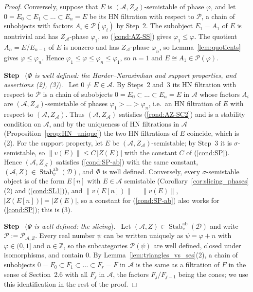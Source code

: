 \documentclass[12pt]{amsart}
\newcommand{\condref}[1]{\textup{(\ref{#1})}}
\numberwithin{theorem}{section}
\theoremstyle{definition}
\newcounter{pstep}
\newcommand{\step}[1]{\par\medskip\noindent\refstepcounter{pstep}\textbf{Step \thepstep}\ (\textit{#1}).\ \ignorespaces}
\newcommand{\ZZ}{\mathbb{Z}}
\newcommand{\calA}{\mathcal{A}}
\newcommand{\calP}{\mathcal{P}}
\newcommand{\calD}{\mathcal{D}}
\begin{document}
\begin{proof}
		Conversely, suppose that $E$ is $(\calA, Z_{\calA})$-semistable of phase $\varphi$, and let $0 = E_0 \subset E_1 \subset \ldots \subset E_n = E$ be its HN filtration with respect to $\calP$, a chain of subobjects with factors $A_i \in \calP(\varphi_i)$ by Step~2.
		The subobject $E_1 = A_1$ of $E$ is nontrivial and has $Z_{\calA}$-phase $\varphi_1$, so \condref{cond:AZ-SS} gives $\varphi_1 \leqslant \varphi$.
		The quotient $A_n = E / E_{n-1}$ of $E$ is nonzero and has $Z_{\calA}$-phase $\varphi_n$, so Lemma~\ref{lem:quotients} gives $\varphi \leqslant \varphi_n$.
		Hence $\varphi_1 \leqslant \varphi \leqslant \varphi_n \leqslant \varphi_1$, so $n = 1$ and $E \cong A_1 \in \calP(\varphi)$.

		\step{$\Phi$ is well defined: the Harder--Narasimhan and support properties, and assertions (2), (3)}
		Let $0 \neq E \in \calA$.
		By Steps~2 and~3 its HN filtration with respect to $\calP$ is a chain of subobjects $0 = E_0 \subset \ldots \subset E_n = E$ in $\calA$ whose factors $A_i$ are $(\calA, Z_{\calA})$-semistable of phases $\varphi_1 > \ldots > \varphi_n$, i.e.\ an HN filtration of $E$ with respect to $(\calA, Z_{\calA})$.
		Thus $(\calA, Z_{\calA})$ satisfies \condref{cond:AZ-SC2} and is a stability condition on $\calA$, and by the uniqueness of HN filtrations in $\calA$ (Proposition~\ref{prop:HN_unique}) the two HN filtrations of $E$ coincide, which is (2).
		For the support property, let $E$ be $(\calA, Z_{\calA})$-semistable;
		by Step~3 it is $\sigma$-semistable, so $\| v(E) \| \leqslant C \, |Z(E)|$ with the constant $C$ of \condref{cond:SP}.
		Hence $(\calA, Z_{\calA})$ satisfies \condref{cond:SP-ab} with the same constant, $(\calA, Z) \in \operatorname{Stab}^{\mathrm{ab}}_v(\calD)$, and $\Phi$ is well defined.
		Conversely, every $\sigma$-semistable object is of the form $E[n]$ with $E \in \calA$ semistable (Corollary~\ref{cor:slicing_phases}(2) and \condref{cond:SL1}), and $\| v(E[n]) \| = \| v(E) \|$, $|Z(E[n])| = |Z(E)|$, so a constant for \condref{cond:SP-ab} also works for \condref{cond:SP}; this is (3).

		\step{$\Psi$ is well defined: the slicing}
		Let $(\calA, Z) \in \operatorname{Stab}^{\mathrm{ab}}_v(\calD)$ and write $\calP := \calP_{\calA, Z}$.
		Every real number $\psi$ can be written uniquely as $\psi = \varphi + n$ with $\varphi \in (0, 1]$ and $n \in \ZZ$, so the subcategories $\calP(\psi)$ are well defined, closed under isomorphisms, and contain $0$.
		By Lemma~\ref{lem:triangles_vs_ses}(2), a chain of subobjects $0 = F_0 \subset F_1 \subset \ldots \subset F_r = F$ in $\calA$ is the same as a filtration of $F$ in the sense of Section~2.6 with all $F_j$ in $\calA$, the factors $F_j / F_{j-1}$ being the cones;
		we use this identification in the rest of the proof.


\end{proof}
\end{document}
